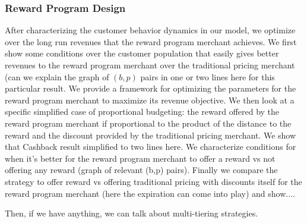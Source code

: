 \subsubsection{Reward Program Design}
After characterizing the customer behavior dynamics in our model, we optimize over the long run revenues that the reward program merchant achieves.
We first show some conditions over the customer population that easily gives better revenues to the reward program merchant over the traditional pricing merchant {\arpit(can we explain the graph of $(b,p)$ pairs in one or two lines here for this particular result.}
We provide a framework for optimizing the parameters for the reward program merchant to maximize its revenue objective.
We then look at a specific simplified case of proportional budgeting: the reward offered by the reward program merchant if proportional to the product of the distance to the reward and the discount provided by the traditional pricing merchant.
We show that {\arpit Cashback result simplified to two lines here}.
We characterize conditions for when it's better for the reward program merchant to offer a reward vs not offering any reward {\arpit(graph of relevant (b,p) pairs)}. 
Finally we compare the strategy to offer reward vs offering traditional pricing with discounts itself for the reward program merchant {\arpit(here the expiration can come into play) and show...}.

{\arpit Then, if we have anything, we can talk about multi-tiering strategies.}
